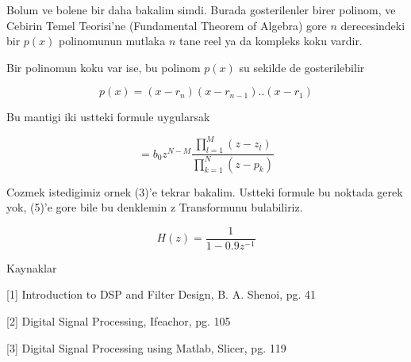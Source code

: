 \documentclass[12pt,fleqn]{article}
\begin{document}
Bolum ve bolene bir daha bakalim simdi. Burada gosterilenler birer polinom,
ve Cebirin Temel Teorisi'ne (Fundamental Theorem of Algebra) gore $n$
derecesindeki bir $p(x)$ polinomunun mutlaka $n$ tane reel ya da kompleks
koku vardir. 

Bir polinomun koku var ise, bu polinom $p(x)$ su sekilde de gosterilebilir

\[ p(x) = (x-r_n)(x-r_{n-1})..(x-r_1) \]

Bu mantigi iki ustteki formule uygularsak 

\[ = b_0 z^{N - M} 
\frac{\prod_{l=1}^{M}(z-z_l)}{ \prod_{k=1}^{N}(z-p_k) }
\]

Cozmek istedigimiz ornek (3)'e tekrar bakalim. Ustteki formule bu noktada
gerek yok, (5)'e gore bile bu denklemin z Transformunu bulabiliriz. 

\[ H(z) = \frac{1}{1-0.9z^{-1}} \]























Kaynaklar

[1] Introduction to DSP and Filter Design, B. A. Shenoi, pg. 41

[2] Digital Signal Processing, Ifeachor, pg. 105

[3] Digital Signal Processing using Matlab, Slicer, pg. 119
\end{document}
